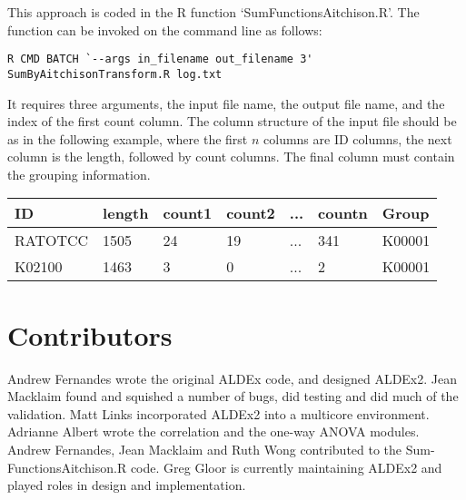 \documentclass[11pt]{article}
\begin{document}
{This approach is coded in the R function `SumFunctionsAitchison.R'. The function can be invoked on the command line as follows:
\begin{verbatim}
R CMD BATCH `--args in_filename out_filename 3' SumByAitchisonTransform.R log.txt 
\end{verbatim}
It requires three arguments, the input file name, the output file name, and the index of the first count column. The column structure of the input file should be as in the following example, where the first $n$ columns are ID columns, the next column is the length, followed by count columns. The final column must contain the grouping information.\\

\begin{tabular}{lllllll}
ID & length & count1 & count2 & ... & countn & Group\\\hline
RATOTCC & 1505 & 24 & 19 & ... & 341 & K00001\\
K02100 & 1463 & 3 & 0 & ... & 2 & K00001\\
\end{tabular}

\section{Contributors}
Andrew Fernandes wrote the original ALDEx code, and designed ALDEx2. Jean Macklaim found and squished a number of bugs, did  testing and did much of the validation. Matt Links incorporated ALDEx2 into a multicore environment. Adrianne Albert wrote the correlation and the one-way ANOVA modules. Andrew Fernandes, Jean Macklaim and Ruth Wong contributed to the Sum-FunctionsAitchison.R code. Greg Gloor is currently maintaining ALDEx2 and played roles in design and implementation.


}
\end{document}
